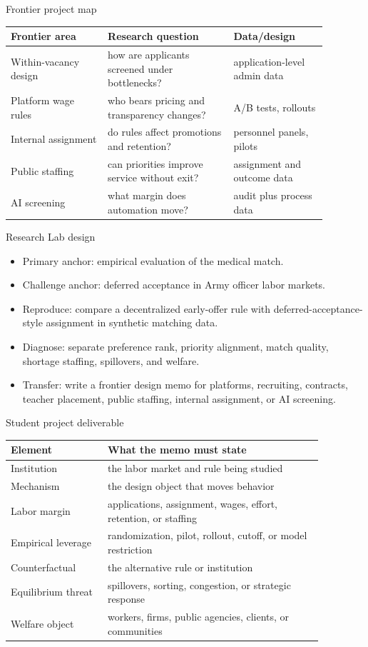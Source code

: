 \documentclass[aspectratio=169,11pt]{beamer}
\begin{document}
\begin{frame}{Frontier project map}
\small
\begin{tabular}{p{0.27\linewidth} p{0.35\linewidth} p{0.26\linewidth}}
\toprule
Frontier area & Research question & Data/design \\
\midrule
Within-vacancy design & how are applicants screened under bottlenecks? & application-level admin data \\
Platform wage rules & who bears pricing and transparency changes? & A/B tests, rollouts \\
Internal assignment & do rules affect promotions and retention? & personnel panels, pilots \\
Public staffing & can priorities improve service without exit? & assignment and outcome data \\
AI screening & what margin does automation move? & audit plus process data \\
\bottomrule
\end{tabular}
\end{frame}

\begin{frame}{Research Lab design}
\begin{itemize}
    \item Primary anchor: empirical evaluation of the medical match.
    \item Challenge anchor: deferred acceptance in Army officer labor markets.
    \item Reproduce: compare a decentralized early-offer rule with deferred-acceptance-style assignment in synthetic matching data.
    \item Diagnose: separate preference rank, priority alignment, match quality, shortage staffing, spillovers, and welfare.
    \item Transfer: write a frontier design memo for platforms, recruiting, contracts, teacher placement, public staffing, internal assignment, or AI screening.
\end{itemize}
\end{frame}

\begin{frame}{Student project deliverable}
\small
\begin{tabular}{p{0.27\linewidth} p{0.60\linewidth}}
\toprule
Element & What the memo must state \\
\midrule
Institution & the labor market and rule being studied \\
Mechanism & the design object that moves behavior \\
Labor margin & applications, assignment, wages, effort, retention, or staffing \\
Empirical leverage & randomization, pilot, rollout, cutoff, or model restriction \\
Counterfactual & the alternative rule or institution \\
Equilibrium threat & spillovers, sorting, congestion, or strategic response \\
Welfare object & workers, firms, public agencies, clients, or communities \\
\bottomrule
\end{tabular}
\end{frame}
\end{document}
